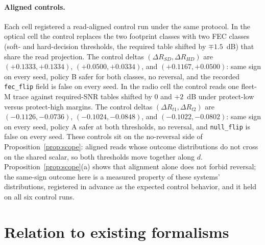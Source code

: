 \documentclass[11pt]{article}
\theoremstyle{definition}
\theoremstyle{remark}
\begin{document}
\paragraph{Aligned controls.}
Each cell registered a read-aligned control run under the same protocol. In
the optical cell the control replaces the two footprint classes with two FEC
classes (soft- and hard-decision thresholds, the required table shifted by
$\mp 1.5$~dB) that share the read projection. The control deltas
$(\Delta R_{SD}, \Delta R_{HD})$ are $(+0.1333, +0.1334)$,
$(+0.0500, +0.0334)$, and $(+0.1167, +0.0500)$: same sign on every seed,
policy B safer for both classes, no reversal, and the recorded
\texttt{fec\_flip} field is false on every seed. In the radio cell the
control reads one fleet-M trace against required-SNR tables shifted by 0 and
$+2$~dB under protect-low versus protect-high margins. The control deltas
$(\Delta R_{t1}, \Delta R_{t2})$ are $(-0.1126, -0.0736)$,
$(-0.1024, -0.0848)$, and $(-0.1022, -0.0802)$: same sign on every seed,
policy A safer at both thresholds, no reversal, and \texttt{null\_flip} is
false on every seed. These controls sit on the no-reversal side of
Proposition~\ref{prop:scope}: aligned reads whose outcome distributions do
not cross on the shared scalar, so both thresholds move together along $d$.
Proposition~\ref{prop:scope}(a) shows that alignment alone does not forbid
reversal; the same-sign outcome here is a measured property of these
systems' distributions, registered in advance as the expected control
behavior, and it held on all six control runs.

\section{Relation to existing formalisms}\label{sec:related}
\end{document}
